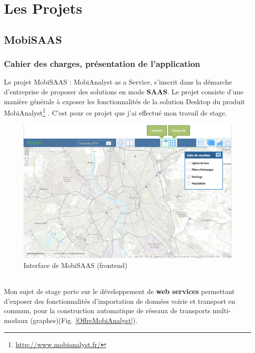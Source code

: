\chapter{Les Projets}
\label{Developpement}

\section{MobiSAAS}

\subsection{Cahier des charges, présentation de l'application}

Le projet \og MobiSAAS \fg : MobiAnalyst as a Service, s'inscrit dans la démarche d'entreprise de proposer des solutions en mode \textbf{SAAS}. Le projet consiste d'une manière générale à exposer les fonctionnalités de la solution Desktop du produit \og MobiAnalyst\footnote{\url{http://www.mobianalyst.fr/}} \fg. C'est pour ce projet que j'ai effectué mon travail de stage. \\

\begin{figure}[!h]
\centering
\includegraphics[width=16cm]{images/MobiSAAS_IHM.png}
\caption{\label{MobiSAAS_IHM.png}Interface de MobiSAAS (frontend)}
\end{figure} 
\\


Mon sujet de stage porte sur le développement de \textbf{web services} permettant d'exposer des fonctionnalités d'importation de données voirie et transport en commun, pour la construction automatique de réseaux de transports multi-modaux (graphes)(Fig. \ref{OffreMobiAnalyst}). \\

